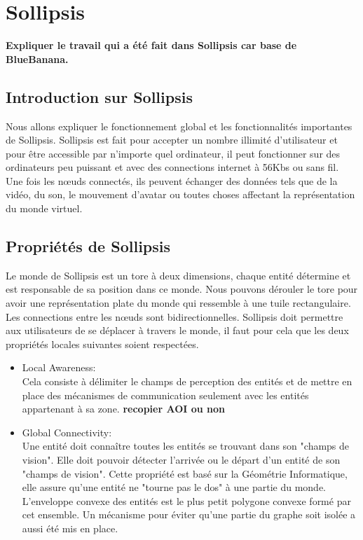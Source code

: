 \section{Sollipsis}
	\label{sollipsis}
	\textbf{Expliquer le travail qui a été fait dans Sollipsis car base de BlueBanana. }
	\subsection{Introduction sur Sollipsis} 
	Nous allons expliquer le fonctionnement global et les fonctionnalités importantes de Sollipsis. Sollipsis est fait pour accepter un nombre illimité d'utilisateur et pour être accessible par n'importe quel ordinateur, il peut fonctionner sur des ordinateurs peu puissant et avec des connections internet à 56Kbs ou sans fil. Une fois les nœuds connectés, ils peuvent échanger des données tels que de la vidéo, du son, le mouvement d'avatar ou toutes choses affectant la représentation du monde virtuel. \\
	\subsection{Propriétés de Sollipsis}
	Le monde de Sollipsis est un tore à deux dimensions, chaque entité détermine et est responsable de sa position dans ce monde. Nous pouvons dérouler le tore pour avoir une représentation plate du monde qui ressemble à une tuile rectangulaire. Les connections entre les nœuds sont bidirectionnelles. Sollipsis doit permettre aux utilisateurs de se déplacer à travers le monde, il faut pour cela que les deux propriétés locales suivantes soient respectées.
	\begin{itemize}
		\item Local Awareness:\\
		Cela consiste à délimiter le champs de perception des entités et de mettre en place des mécanismes de communication seulement avec les entités appartenant à sa zone. \textbf{recopier AOI ou non }
		\item Global Connectivity:\\
		Une entité doit connaître toutes les entités se trouvant dans son "champs de vision". Elle doit pouvoir détecter l'arrivée ou le départ d'un entité de son "champs de vision". Cette propriété est basé sur la Géométrie Informatique, elle assure qu'une entité ne "tourne pas le dos" à une partie du monde. L'enveloppe convexe des entités est le plus petit polygone convexe formé par cet ensemble. Un mécanisme pour éviter qu'une partie du graphe soit isolée a aussi été mis en place.\\
	\end{itemize}

